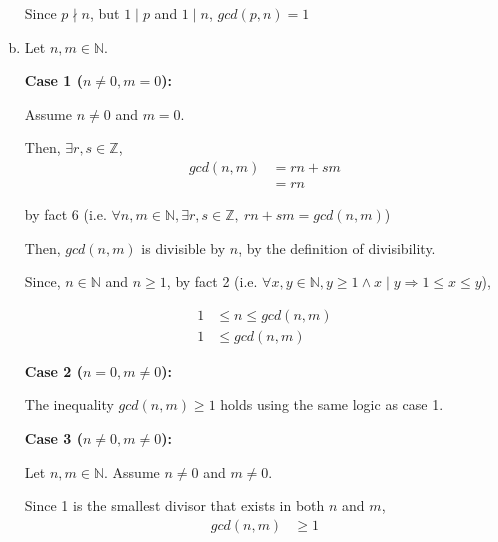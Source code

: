 \documentclass[12pt]{article}
\begin{document}
\begin{enumerate}[a.]
    Since $p \nmid n$, but $1 \mid p$ and $1 \mid n$, $gcd(p,n) = 1$

    \item

    Let $n,m \in \mathbb{N}$.

    \bigskip

    \textbf{Case 1 ($n \neq 0, m = 0$):}

    \bigskip

    Assume $n \neq 0$ and $m = 0$.

    \bigskip

    Then, $\exists r,s \in \mathbb{Z}$,
    \setcounter{equation}{0}
    \begin{align}
        gcd(n,m) &= rn + sm\\
        &= rn
    \end{align}

    by fact 6 (i.e. $\forall n,m \in \mathbb{N}, \exists r,s \in \mathbb{Z},\:
    rn + sm = gcd(n,m)$)

    \bigskip

    Then, $gcd(n,m)$ is divisible by $n$, by the definition of divisibility.

    \bigskip

    Since, $n \in \mathbb{N}$ and $n \geq 1$, by fact 2 (i.e. $\forall x,y \in
    \mathbb{N}, y \geq 1 \land x \mid y \Rightarrow 1 \leq x \leq y$),

    \begin{align}
        1 &\leq n \leq gcd(n,m)\\
        1 &\leq gcd(n,m)
    \end{align}

    \bigskip

    \textbf{Case 2 ($n = 0, m \neq 0$):}

    \bigskip

    The inequality $gcd(n,m) \geq 1$ holds using the same logic as case 1.

    \bigskip

    \textbf{Case 3 ($n \neq 0, m \neq 0$):}

    \bigskip

    Let $n,m \in \mathbb{N}$. Assume $n \neq 0$ and $m \neq 0$.

    \bigskip

    Since 1 is the smallest divisor that exists in both $n$ and $m$,
    \setcounter{equation}{0}
    \begin{align}
        gcd(n,m) &\geq 1
    \end{align}


\end{enumerate}
\end{document}
